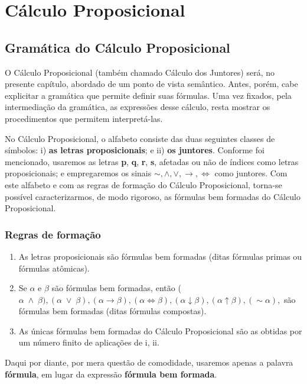 \chapter{Cálculo Proposicional}

\section{Gramática do Cálculo Proposicional}

O Cálculo Proposicional (também chamado Cálculo dos Juntores) será, no presente capítulo, abordado de um ponto de vista semântico.
Antes, porém, cabe explicitar a gramática que permite definir suas fórmulas.
Uma vez fixados, pela intermediação da gramática, as expressões desse cálculo, resta mostrar os procedimentos que permitem interpretá-las.

No Cálculo Proposicional, o alfabeto consiste das duas seguintes classes de símbolos: i) \textbf{as letras proposicionais}; e ii) \textbf{os juntores}.
Conforme foi mencionado, usaremos as letras \textbf{p}, \textbf{q}, \textbf{r}, \textbf{s}, afetadas ou não de índices como letras proposicionais; e empregaremos os sinais $\sim, \land, \lor, \to, \iff$ como juntores.
Com este alfabeto e com as regras de formação do Cálculo Proposicional, torna-se possível caracterizarmos, de modo rigoroso, as fórmulas bem formadas do Cálculo Proposicional.

\subsection*{Regras de formação}

\begin{enumerate}[label={\roman*})]
    \item As letras proposicionais são fórmulas bem formadas (ditas fórmulas primas ou fórmulas atômicas).

    \item Se $\alpha$ e $\beta$ são fórmulas bem formadas, então ($\alpha \; \land \; \beta), (\alpha \; \lor \; \beta), (\alpha \to \beta), (\alpha \iff \beta), (\alpha \downarrow \beta), (\alpha \uparrow \beta), (\sim\alpha),$ são fórmulas bem formadas (ditas fórmulas compostas).

    \item As únicas fórmulas bem formadas do Cálculo Proposicional são as obtidas por um número finito de aplicações de i, ii.
\end{enumerate}

Daqui por diante, por mera questão de comodidade, usaremos apenas a palavra \textbf{fórmula}, em lugar da expressão \textbf{fórmula bem formada}.


